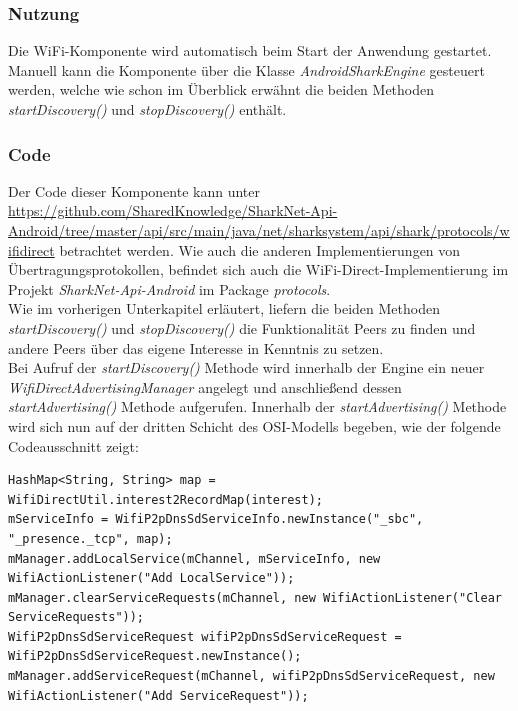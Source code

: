 \subsubsection{Nutzung}
Die WiFi-Komponente wird automatisch beim Start der Anwendung gestartet. Manuell kann die Komponente über die Klasse \textit{AndroidSharkEngine} gesteuert werden, welche wie schon im Überblick erwähnt die beiden Methoden \textit{startDiscovery()} und \textit{stopDiscovery()} enthält.


\subsubsection{Code}
\begin{sloppypar}
Der Code dieser Komponente kann unter \url{https://github.com/SharedKnowledge/SharkNet-Api-Android/tree/master/api/src/main/java/net/sharksystem/api/shark/protocols/wifidirect} betrachtet werden. Wie auch die anderen Implementierungen von Über\-tra\-gungs\-pro\-to\-kol\-len, befindet sich auch die WiFi-Direct-Implementierung im Projekt \textit{Shark\-Net-Api-Android} im Package \textit{protocols}.
\\Wie im vorherigen Unterkapitel erläutert, liefern die beiden Methoden \textit{startDiscovery()} und \textit{stopDiscovery()} die Funktionalität Peers zu finden und andere Peers über das eigene Interesse in Kenntnis zu setzen.\\
Bei Aufruf der \textit{startDiscovery()} Methode wird innerhalb der Engine ein neuer \textit{Wifi\-DirectAdvertisingManager} angelegt und anschließend dessen \textit{startAdvertising()} Methode aufgerufen. Innerhalb der \textit{startAdvertising()} Methode wird sich nun auf der dritten Schicht des OSI-Modells begeben, wie der folgende Codeausschnitt zeigt:
\end{sloppypar}
\newpage
\lstset{language=Java, caption=Hinzufügung des Services, label=DescriptiveLabel, numbers=left, numbersep=1em, breaklines=true, basicstyle=\small}
\begin{lstlisting}
HashMap<String, String> map = WifiDirectUtil.interest2RecordMap(interest);
mServiceInfo = WifiP2pDnsSdServiceInfo.newInstance("_sbc", "_presence._tcp", map);
mManager.addLocalService(mChannel, mServiceInfo, new WifiActionListener("Add LocalService"));
mManager.clearServiceRequests(mChannel, new WifiActionListener("Clear ServiceRequests"));
WifiP2pDnsSdServiceRequest wifiP2pDnsSdServiceRequest = WifiP2pDnsSdServiceRequest.newInstance();
mManager.addServiceRequest(mChannel, wifiP2pDnsSdServiceRequest, new WifiActionListener("Add ServiceRequest"));
\end{lstlisting}
